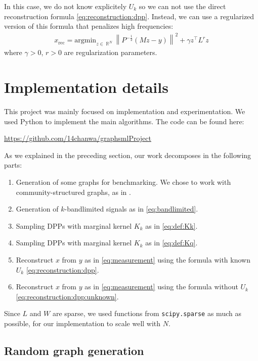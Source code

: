 \documentclass{article}
\newcommand{\norm}[1]{\left\|#1\right\|}
\DeclareMathOperator{\R}{\mathbb{R}}
\begin{document}
In this case, we do not know explicitely $U_k$ so we can not use the direct reconstruction formula \eqref{eq:reconstruction:dpp}. Instead, we can use a regularized version of this formula that penalizes high frequencies:
\begin{align} \boxed{x_{\text{rec}} = \mathrm{argmin}_{z \in \R^N} \norm{P^{-\frac{1}{2}} \left( M z - y \right)}^2 + \gamma z^\top L^r z} \label{eq:reconstruction:dpp:unknown}\end{align}
where $\gamma > 0$, $r > 0$ are regularization parameters.

\section{Implementation details}


This project was mainly focused on implementation and experimentation. We used Python to implement the main algorithms. The code can be found here:
\begin{center}
  \url{https://github.com/14chanwa/graphsmlProject}
\end{center}


As we explained in the preceding section, our work decomposes in the following parts:
\begin{enumerate}
\item Generation of some graphs for benchmarking. We chose to work with community-structured graphs, as in \cite{tremblay2017}.
\item Generation of $k$-bandlimited signals as in \eqref{eq:bandlimited}.
\item Sampling DPPs with marginal kernel $K_k$ as in \eqref{eq:def:Kk}.
\item Sampling DPPs with marginal kernel $K_k$ as in \eqref{eq:def:Kq}.
\item Reconstruct $x$ from $y$ as in \eqref{eq:measurement} using the formula with known $U_k$ \eqref{eq:reconstruction:dpp}.
\item Reconstruct $x$ from $y$ as in \eqref{eq:measurement} using the formula without $U_k$ \eqref{eq:reconstruction:dpp:unknown}.
\end{enumerate}


Since $L$ and $W$ are sparse, we used functions from \verb#scipy.sparse# as much as possible, for our implementation to scale well with $N$.


\subsection{Random graph generation} \label{subs:random_graph_generation}
\end{document}
